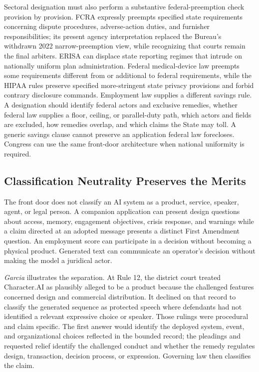 Sectoral designation must also perform a substantive federal-preemption check provision by provision. FCRA expressly preempts specified state requirements concerning dispute procedures, adverse-action duties, and furnisher responsibilities; its present agency interpretation replaced the Bureau's withdrawn 2022 narrow-preemption view, while recognizing that courts remain the final arbiters. ERISA can displace state reporting regimes that intrude on nationally uniform plan administration. Federal medical-device law preempts some requirements different from or additional to federal requirements, while the HIPAA rules preserve specified more-stringent state privacy provisions and forbid contrary disclosure commands. Employment law supplies a different savings rule. A designation should identify federal actors and exclusive remedies, whether federal law supplies a floor, ceiling, or parallel-duty path, which actors and fields are excluded, how remedies overlap, and which claims the State may toll. A generic savings clause cannot preserve an application federal law forecloses. Congress can use the same front-door architecture when national uniformity is required.

\subsection{Classification Neutrality Preserves the Merits}

The front door does not classify an AI system as a product, service, speaker, agent, or legal person. A companion application can present design questions about access, memory, engagement objectives, crisis response, and warnings while a claim directed at an adopted message presents a distinct First Amendment question. An employment score can participate in a decision without becoming a physical product. Generated text can communicate an operator's decision without making the model a juridical actor.

\emph{Garcia} illustrates the separation. At Rule 12, the district court treated Character.AI as plausibly alleged to be a product because the challenged features concerned design and commercial distribution. It declined on that record to classify the generated sequence as protected speech where defendants had not identified a relevant expressive choice or speaker. Those rulings were procedural and claim specific. The first answer would identify the deployed system, event, and organizational choices reflected in the bounded record; the pleadings and requested relief identify the challenged conduct and whether the remedy regulates design, transaction, decision process, or expression. Governing law then classifies the claim.

